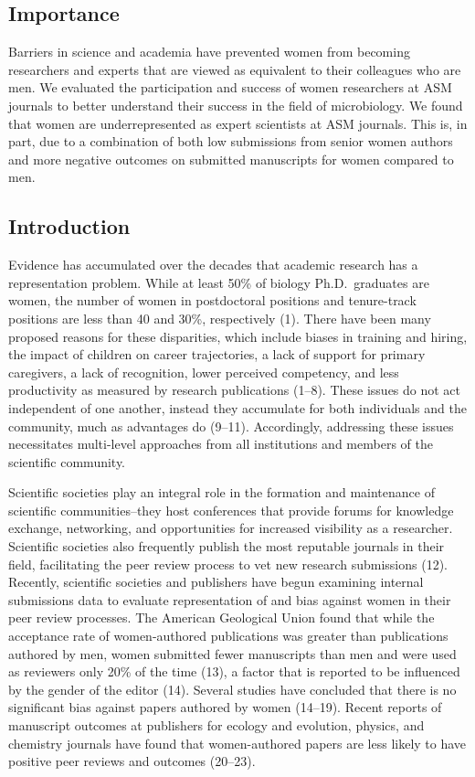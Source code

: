 \documentclass[11pt,]{article}
\begin{document}
\hypertarget{importance}{%
\subsection{Importance}\label{importance}}

Barriers in science and academia have prevented women from becoming
researchers and experts that are viewed as equivalent to their
colleagues who are men. We evaluated the participation and success of
women researchers at ASM journals to better understand their success in
the field of microbiology. We found that women are underrepresented as
expert scientists at ASM journals. This is, in part, due to a
combination of both low submissions from senior women authors and more
negative outcomes on submitted manuscripts for women compared to men.

\hypertarget{introduction}{%
\subsection{Introduction}\label{introduction}}

Evidence has accumulated over the decades that academic research has a
representation problem. While at least 50\% of biology Ph.D.~graduates
are women, the number of women in postdoctoral positions and
tenure-track positions are less than 40 and 30\%, respectively (1).
There have been many proposed reasons for these disparities, which
include biases in training and hiring, the impact of children on career
trajectories, a lack of support for primary caregivers, a lack of
recognition, lower perceived competency, and less productivity as
measured by research publications (1--8). These issues do not act
independent of one another, instead they accumulate for both individuals
and the community, much as advantages do (9--11). Accordingly,
addressing these issues necessitates multi-level approaches from all
institutions and members of the scientific community.

Scientific societies play an integral role in the formation and
maintenance of scientific communities--they host conferences that
provide forums for knowledge exchange, networking, and opportunities for
increased visibility as a researcher. Scientific societies also
frequently publish the most reputable journals in their field,
facilitating the peer review process to vet new research submissions
(12). Recently, scientific societies and publishers have begun examining
internal submissions data to evaluate representation of and bias against
women in their peer review processes. The American Geological Union
found that while the acceptance rate of women-authored publications was
greater than publications authored by men, women submitted fewer
manuscripts than men and were used as reviewers only 20\% of the time
(13), a factor that is reported to be influenced by the gender of the
editor (14). Several studies have concluded that there is no significant
bias against papers authored by women (14--19). Recent reports of
manuscript outcomes at publishers for ecology and evolution, physics,
and chemistry journals have found that women-authored papers are less
likely to have positive peer reviews and outcomes (20--23).
\end{document}
